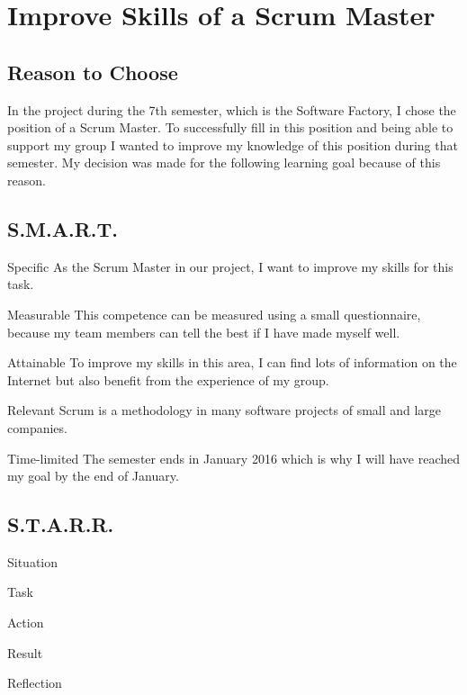 \section{Improve Skills of a Scrum Master}
	\subsection{Reason to Choose}
		In the project during the 7th semester, which is the Software Factory, I chose the position of a Scrum Master. To successfully fill in this position and being able to support my group I wanted to improve my knowledge of this position during that semester.
		My decision was made for the following learning goal because of this reason.

	\subsection{S.M.A.R.T.}
	\begin{SMART}
	    \item[Specific] As the Scrum Master in our project, I want to improve my skills for this task.
	    \item[Measurable] This competence can be measured using a small questionnaire, because my team members can tell the best if I have made myself well.
	    \item[Attainable] To improve my skills in this area, I can find lots of information on the Internet but also benefit from the experience of my group.
	    \item[Relevant] Scrum is a methodology in many software projects of small and large companies.
	    \item[Time-limited] The semester ends in January 2016 which is why I will have reached my goal by the end of January.
	\end{SMART}
	
	\subsection{S.T.A.R.R.}
	\begin{STARR}
	    \item[Situation] 
	    \item[Task] 
	    \item[Action] 
	    \item[Result] 
	    \item[Reflection] 
	\end{STARR}